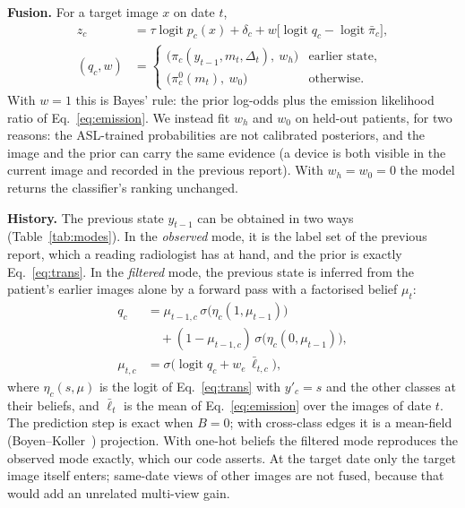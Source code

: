 \documentclass[conference]{IEEEtran}
\begin{document}
\textbf{Fusion.} For a target image $x$ on date $t$,
\begin{align}
z_c &= \tau \operatorname{logit} p_c(x) + \delta_c + w \bigl[\operatorname{logit} q_c - \operatorname{logit} \bar\pi_c\bigr], \label{eq:fuse}\\
(q_c, w) &= \begin{cases}
\bigl(\pi_c(y_{t-1}, m_t, \Delta_t),\ w_h\bigr) & \text{earlier state},\\
\bigl(\pi^{0}_c(m_t),\ w_0\bigr) & \text{otherwise}.
\end{cases} \label{eq:qw}
\end{align}
With $w = 1$ this is Bayes' rule: the prior log-odds plus the emission likelihood ratio of Eq.~\eqref{eq:emission}. We instead fit $w_h$ and $w_0$ on held-out patients, for two reasons: the ASL-trained probabilities are not calibrated posteriors, and the image and the prior can carry the same evidence (a device is both visible in the current image and recorded in the previous report). With $w_h = w_0 = 0$ the model returns the classifier's ranking unchanged.

\textbf{History.} The previous state $y_{t-1}$ can be obtained in two ways (Table~\ref{tab:modes}). In the \emph{observed} mode, it is the label set of the previous report, which a reading radiologist has at hand, and the prior is exactly Eq.~\eqref{eq:trans}. In the \emph{filtered} mode, the previous state is inferred from the patient's earlier images alone by a forward pass with a factorised belief $\mu_t$:
\begin{align}
q_c &= \mu_{t-1,c}\, \sigma\bigl(\eta_c(1, \mu_{t-1})\bigr) \nonumber\\
&\quad + (1 - \mu_{t-1,c})\, \sigma\bigl(\eta_c(0, \mu_{t-1})\bigr), \label{eq:predict}\\
\mu_{t,c} &= \sigma\bigl(\operatorname{logit} q_c + w_e\, \bar\ell_{t,c}\bigr), \label{eq:update}
\end{align}
where $\eta_c(s, \mu)$ is the logit of Eq.~\eqref{eq:trans} with $y'_c = s$ and the other classes at their beliefs, and $\bar\ell_t$ is the mean of Eq.~\eqref{eq:emission} over the images of date $t$. The prediction step is exact when $B = 0$; with cross-class edges it is a mean-field (Boyen--Koller~\cite{b24}) projection. With one-hot beliefs the filtered mode reproduces the observed mode exactly, which our code asserts. At the target date only the target image itself enters; same-date views of other images are not fused, because that would add an unrelated multi-view gain.
\end{document}
